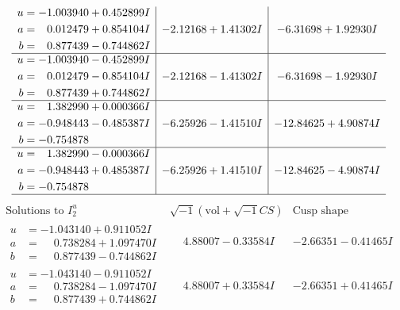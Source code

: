 \documentclass[1p]{elsarticle_modified}
\theoremstyle{definition}
\newcommand{\I}{\sqrt{-1}}
\begin{document}
$$\begin{array}{c|c|c}
\begin{aligned}
u &= -1.003940 + 0.452899 I \\
a &= \phantom{-}0.012479 + 0.854104 I \\
b &= \phantom{-}0.877439 - 0.744862 I\end{aligned}
 & -2.12168 + 1.41302 I & -6.31698 + 1.92930 I \\ \hline\begin{aligned}
u &= -1.003940 - 0.452899 I \\
a &= \phantom{-}0.012479 - 0.854104 I \\
b &= \phantom{-}0.877439 + 0.744862 I\end{aligned}
 & -2.12168 - 1.41302 I & -6.31698 - 1.92930 I \\ \hline\begin{aligned}
u &= \phantom{-}1.382990 + 0.000366 I \\
a &= -0.948443 - 0.485387 I \\
b &= -0.754878\phantom{ +0.000000I}\end{aligned}
 & -6.25926 - 1.41510 I & -12.84625 + 4.90874 I \\ \hline\begin{aligned}
u &= \phantom{-}1.382990 - 0.000366 I \\
a &= -0.948443 + 0.485387 I \\
b &= -0.754878\phantom{ +0.000000I}\end{aligned}
 & -6.25926 + 1.41510 I & -12.84625 - 4.90874 I\\
 \hline 
 \end{array}$$\newpage$$\begin{array}{c|c|c}  
\text{Solutions to }I^u_{2}& \I (\text{vol} + \sqrt{-1}CS) & \text{Cusp shape}\\
 \hline 
\begin{aligned}
u &= -1.043140 + 0.911052 I \\
a &= \phantom{-}0.738284 + 1.097470 I \\
b &= \phantom{-}0.877439 - 0.744862 I\end{aligned}
 & \phantom{-}4.88007 - 0.33584 I & -2.66351 - 0.41465 I \\ \hline\begin{aligned}
u &= -1.043140 - 0.911052 I \\
a &= \phantom{-}0.738284 - 1.097470 I \\
b &= \phantom{-}0.877439 + 0.744862 I\end{aligned}
 & \phantom{-}4.88007 + 0.33584 I & -2.66351 + 0.41465 I \\ \hline\begin{aligned}

\end{aligned}
\end{array}$$
\end{document}
